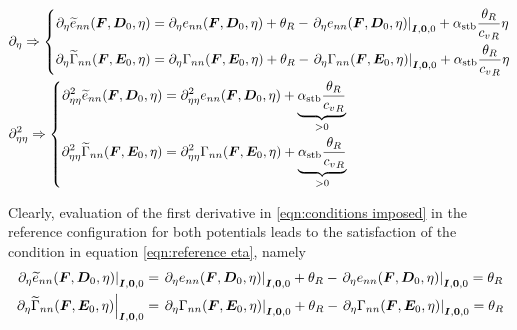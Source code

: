 \begin{equation}\label{eqn:conditions imposed}
\begin{aligned}
&\partial_{\eta}\Rightarrow\left\{\begin{aligned}
\partial_{\eta}\widetilde{e}_{nn}(\vect{F},\vect{D}_0,\eta) &=  \partial_{\eta}{e}_{nn}(\vect{F},\vect{D}_0,\eta) + \theta_R-\left.\partial_{\eta}{e}_{nn}(\vect{F},\vect{D}_0,\eta)\right\vert_{\vect{I},\vect{0},0} + \alpha_{\text{stb}}\frac{\theta_R}{{c_v}_R}\eta\\
%
%
\partial_{\eta}\widetilde{\Gamma}_{nn}(\vect{F},\vect{E}_0,\eta) &=  \partial_{\eta}{\Gamma}_{nn}(\vect{F},\vect{E}_0,\eta) + \theta_R-\left.\partial_{\eta}{\Gamma}_{nn}(\vect{F},\vect{E}_0,\eta)\right\vert_{\vect{I},\vect{0},0} + \alpha_{\text{stb}}\frac{\theta_R}{{c_v}_R}\eta\end{aligned}\right.\\
%
%
&\partial^2_{\eta\eta}\Rightarrow\left\{\begin{aligned}
\partial^2_{\eta\eta}\widetilde{e}_{nn}(\vect{F},\vect{D}_0,\eta)& =  \partial^2_{\eta\eta}{e}_{nn}(\vect{F},\vect{D}_0,\eta)+ \underbrace{\alpha_{\text{stb}}\frac{\theta_R}{{c_v}_R}}_{>0}\\
%
\partial^2_{\eta\eta}\widetilde{\Gamma}_{nn}(\vect{F},\vect{E}_0,\eta)& =  \partial^2_{\eta\eta}{\Gamma}_{nn}(\vect{F},\vect{E}_0,\eta)+ \underbrace{\alpha_{\text{stb}}\frac{\theta_R}{{c_v}_R}}_{>0}
%
\end{aligned}\right.
\end{aligned}
\end{equation}


Clearly, evaluation of the first derivative in \eqref{eqn:conditions imposed} in the reference configuration for both potentials leads to the satisfaction of the condition in equation \eqref{eqn:reference eta}, namely
%
\begin{equation}
\begin{aligned}
\left.\partial_{\eta}\widetilde{e}_{nn}(\vect{F},\vect{D}_0,\eta)\right\vert_{\vect{I},\vect{0},0}& =  \left.\partial_{\eta}{e}_{nn}(\vect{F},\vect{D}_0,\eta)\right\vert_{\vect{I},\vect{0},0} + \theta_R-\left.\partial_{\eta}{e}_{nn}(\vect{F},\vect{D}_0,\eta)\right\vert_{\vect{I},\vect{0},0} = \theta_R\\
%
\left.\partial_{\eta}\widetilde{\Gamma}_{nn}(\vect{F},\vect{E}_0,\eta)\right\vert_{\vect{I},\vect{0},0} &=  \left.\partial_{\eta}{\Gamma}_{nn}(\vect{F},\vect{E}_0,\eta)\right\vert_{\vect{I},\vect{0},0} + \theta_R-\left.\partial_{\eta}{\Gamma}_{nn}(\vect{F},\vect{E}_0,\eta)\right\vert_{\vect{I},\vect{0},0} = \theta_R
\end{aligned}
%
\end{equation}


